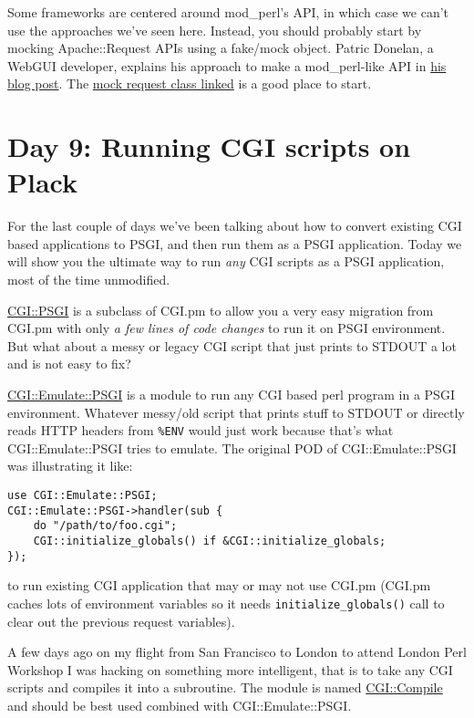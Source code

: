 Some frameworks are centered around mod\_perl's API, in which case we
can't use the approaches we've seen here. Instead, you should probably
start by mocking Apache::Request APIs using a fake/mock object. Patric
Donelan, a WebGUI developer, explains his approach to make a
mod\_perl-like API in
\href{http://blog.patspam.com/2009/plack-roundup-at-sf-pm}{his blog
post}. The
\href{http://github.com/pdonelan/webgui/blob/plebgui/lib/WebGUI/Session/Plack.pm}{mock
request class linked} is a good place to start.

\section{Day 9: Running CGI scripts on
Plack}\label{day-9-running-cgi-scripts-on-plack}

For the last couple of days we've been talking about how to convert
existing CGI based applications to PSGI, and then run them as a PSGI
application. Today we will show you the ultimate way to run \emph{any}
CGI scripts as a PSGI application, most of the time unmodified.

\href{http://search.cpan.org/perldoc?CGI::PSGI}{CGI::PSGI} is a subclass
of CGI.pm to allow you a very easy migration from CGI.pm with only
\emph{a few lines of code changes} to run it on PSGI environment. But
what about a messy or legacy CGI script that just prints to STDOUT a lot
and is not easy to fix?

\href{http://search.cpan.org/perldoc?CGI::Emulate::PSGI}{CGI::Emulate::PSGI}
is a module to run any CGI based perl program in a PSGI environment.
Whatever messy/old script that prints stuff to STDOUT or directly reads
HTTP headers from \lstinline!%ENV! would just work because that's what
CGI::Emulate::PSGI tries to emulate. The original POD of
CGI::Emulate::PSGI was illustrating it like:

\begin{lstlisting}
use CGI::Emulate::PSGI;
CGI::Emulate::PSGI->handler(sub {
    do "/path/to/foo.cgi";
    CGI::initialize_globals() if &CGI::initialize_globals;
});
\end{lstlisting}

to run existing CGI application that may or may not use CGI.pm (CGI.pm
caches lots of environment variables so it needs
\lstinline!initialize_globals()! call to clear out the previous request
variables).

A few days ago on my flight from San Francisco to London to attend
London Perl Workshop I was hacking on something more intelligent, that
is to take any CGI scripts and compiles it into a subroutine. The module
is named
\href{http://search.cpan.org/perldoc?CGI::Compile}{CGI::Compile} and
should be best used combined with CGI::Emulate::PSGI.


